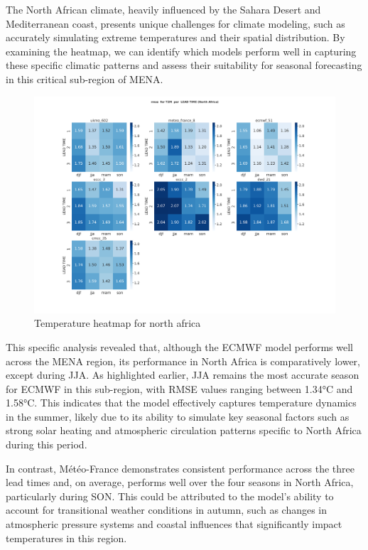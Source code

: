 The North African climate, heavily influenced by the Sahara Desert and Mediterranean coast, presents unique challenges for climate modeling, such as accurately simulating extreme temperatures and their spatial distribution. By examining the heatmap, we can identify which models perform well in capturing these specific climatic patterns and assess their suitability for seasonal forecasting in this critical sub-region of MENA.
\begin{figure}[H]
    \centering
    \includegraphics[width=1\linewidth]{plots/det/rmse/rmse_T2M_NorthAfrica.png}
    \caption{Temperature heatmap for north africa}
   
\end{figure}
This specific analysis revealed that, although the ECMWF model performs well across the MENA region, its performance in North Africa is comparatively lower, except during JJA. As highlighted earlier, JJA remains the most accurate season for ECMWF in this sub-region, with RMSE values ranging between 1.34°C and 1.58°C. This indicates that the model effectively captures temperature dynamics in the summer, likely due to its ability to simulate key seasonal factors such as strong solar heating and atmospheric circulation patterns specific to North Africa during this period.

In contrast, Météo-France demonstrates consistent performance across the three lead times and, on average, performs well over the four seasons in North Africa, particularly during SON. This could be attributed to the model’s ability to account for transitional weather conditions in autumn, such as changes in atmospheric pressure systems and coastal influences that significantly impact temperatures in this region.

